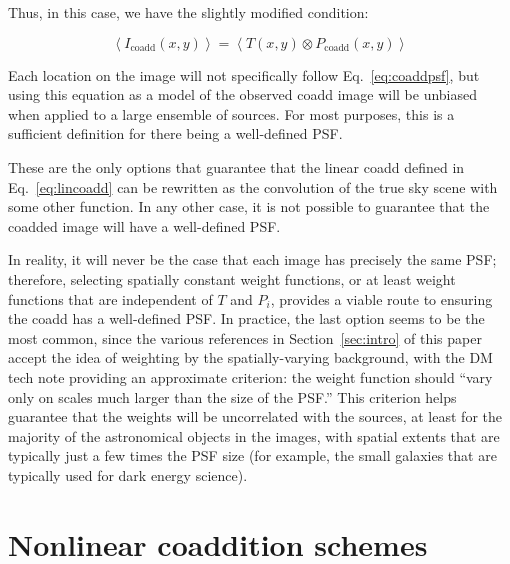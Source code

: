 \documentclass{aastex63}
\newcommand{\rachel}[1]{{\color{magenta}RM: #1}}
\newcommand{\mike}[1]{{\color{cyan}MJ: #1}}
\begin{document}
\begin{itemize}
    Thus, in this case, we have the slightly modified condition:
    \begin{linenomath}\begin{equation}\label{eq:expcoaddpsf}
        \left\langle I_\text{coadd}(x,y) \right\rangle = \left\langle T(x,y) \otimes P_\text{coadd}(x,y) \right\rangle
    \end{equation}\end{linenomath}
    Each location on the image will not specifically follow Eq.~\eqref{eq:coaddpsf}, but using this equation as a model of the observed coadd image will be unbiased when applied to a large ensemble of sources.  For most purposes, this is a sufficient definition for there being a well-defined PSF.

\end{itemize}
These are the only options that guarantee that the linear coadd defined in Eq.~\eqref{eq:lincoadd} can be rewritten as the convolution of the true sky scene with some other function. In any other case, it is not possible to guarantee that the coadded image will have a well-defined PSF.


In reality, it will never be the case that each image has precisely the same PSF; therefore, selecting spatially constant weight functions, or at least weight functions that are independent of $T$ and $P_i$, provides a viable route to ensuring the coadd has a well-defined PSF.  
In practice, the last option seems to be the most common, since the various references in Section~\ref{sec:intro} of this paper accept the idea of weighting by the spatially-varying background, with the DM tech note providing an approximate criterion: the weight function should ``vary only on scales much larger than the size of the PSF.''  This criterion helps guarantee that the weights will be uncorrelated with the sources, at least for the majority of the astronomical objects in the images, with spatial extents that are typically just a few times the PSF size (for example, the small galaxies that are typically used for dark energy science).

\section{Nonlinear coaddition schemes}\label{sec:nonlin}
\end{document}
